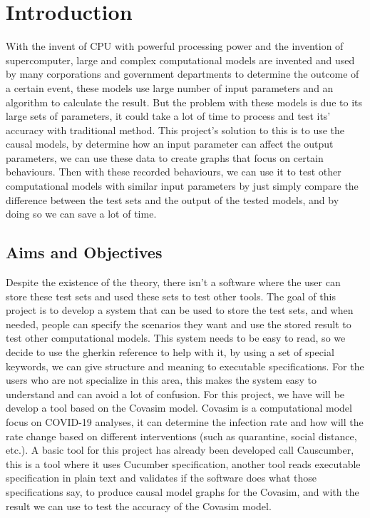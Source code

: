 \chapter{Introduction}

With the invent of CPU with powerful processing power and the invention of supercomputer, large and complex computational models are invented and used by many corporations and government departments to determine the outcome of a certain event, these models use large number of input parameters and an algorithm to calculate the result.
But the problem with these models is due to its large sets of parameters, it could take a lot of time to process and test its’ accuracy with traditional method. This project’s solution to this is to use the causal models, by determine how an input parameter can affect the output parameters, we can use these data to create graphs that focus on certain behaviours. Then with these recorded behaviours, we can use it to test other computational models with similar input parameters by just simply compare the difference between the test sets and the output of the tested models, and by doing so we can save a lot of time.

\section{Aims and Objectives}

Despite the existence of the theory, there isn’t a software where the user can store these test sets and used these sets to test other tools. The goal of this project is to develop a system that can be used to store the test sets, and when needed, people can specify the scenarios they want and use the stored result to test other computational models. 
This system needs to be easy to read, so we decide to use the gherkin reference to help with it, by using a set of special keywords, we can give structure and meaning to executable specifications. For the users who are not specialize in this area, this makes the system easy to understand and can avoid a lot of confusion. 
For this project, we have will be develop a tool based on the Covasim model. Covasim is a computational model focus on COVID-19 analyses, it can determine the infection rate and how will the rate change based on different interventions (such as quarantine, social distance, etc.). 
A basic tool for this project has already been developed call Causcumber, this is a tool where it uses Cucumber specification, another tool reads executable specification in plain text and validates if the software does what those specifications say, to produce causal model graphs for the Covasim, and with the result we can use to test the accuracy of the Covasim model. 

